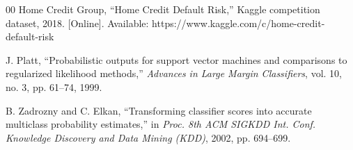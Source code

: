 \documentclass[journal]{IEEEtran}
\begin{document}
\begin{thebibliography}{00}
 Home Credit Group, ``Home Credit Default Risk,'' Kaggle competition dataset, 2018. [Online]. Available: https://www.kaggle.com/c/home-credit-default-risk

 J. Platt, ``Probabilistic outputs for support vector machines and comparisons to regularized likelihood methods,'' \textit{Advances in Large Margin Classifiers}, vol. 10, no. 3, pp. 61--74, 1999.

 B. Zadrozny and C. Elkan, ``Transforming classifier scores into accurate multiclass probability estimates,'' in \textit{Proc. 8th ACM SIGKDD Int. Conf. Knowledge Discovery and Data Mining (KDD)}, 2002, pp. 694--699.

\end{thebibliography}
\end{document}
